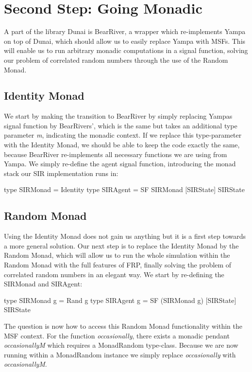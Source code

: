 \section{Second Step: Going Monadic}
\label{sec:timedriven_monadic}

A part of the library Dunai is BearRiver, a wrapper which re-implements Yampa on top of Dunai, which should allow us to easily replace Yampa with MSFs. This will enable us to run arbitrary monadic computations in a signal function, solving our problem of correlated random numbers through the use of the Random Monad.

\subsection{Identity Monad}
We start by making the transition to BearRiver by simply replacing Yampas signal function by BearRivers', which is the same but takes an additional type parameter \textit{m}, indicating the monadic context. If we replace this type-parameter with the Identity Monad, we should be able to keep the code exactly the same, because BearRiver re-implements all necessary functions we are using from Yampa. We simply re-define the agent signal function, introducing the monad stack our SIR implementation runs in:

\begin{HaskellCode}
type SIRMonad = Identity
type SIRAgent = SF SIRMonad [SIRState] SIRState
\end{HaskellCode}

\subsection{Random Monad}
Using the Identity Monad does not gain us anything but it is a first step towards a more general solution. Our next step is to replace the Identity Monad by the Random Monad, which will allow us to run the whole simulation within the Random Monad with the full features of FRP, finally solving the problem of correlated random numbers in an elegant way. We start by re-defining the SIRMonad and SIRAgent:

\begin{HaskellCode}
type SIRMonad g = Rand g
type SIRAgent g = SF (SIRMonad g) [SIRState] SIRState
\end{HaskellCode}

The question is now how to access this Random Monad functionality within the MSF context. For the function \textit{occasionally}, there exists a monadic pendant \textit{occasionallyM} which requires a MonadRandom type-class. Because we are now running within a MonadRandom instance we simply replace \textit{occasionally} with \textit{occasionallyM}. 

